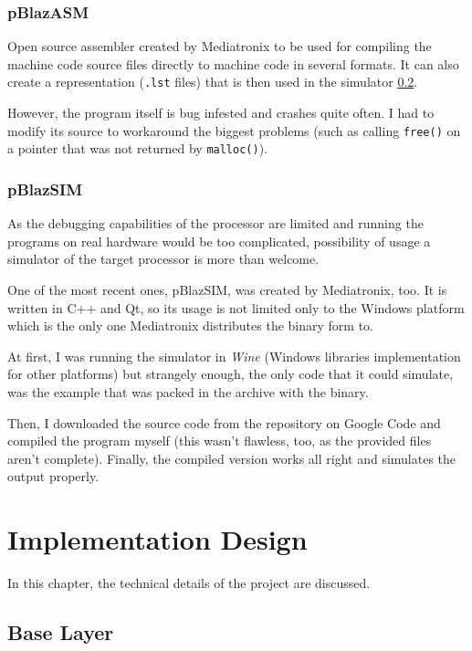         \subsection{pBlazASM}

        Open source assembler created by Mediatronix to be used for compiling the machine code source files directly to machine code in several formats. It can also create a representation (\texttt{.lst} files) that is then used in the simulator \ref{pblazsim}.

        However, the program itself is bug infested and crashes quite often. I had to modify its source to workaround the biggest problems (such as calling \texttt{free()} on a pointer that was not returned by \texttt{malloc()}).

        \subsection{pBlazSIM}\label{pblazsim}

        As the debugging capabilities of the processor are limited and running the programs on real hardware would be too complicated, possibility of usage a simulator of the target processor is more than welcome.

        One of the most recent ones, pBlazSIM, was created by Mediatronix, too. It is written in C++ and Qt, so its usage is not limited only to the Windows platform which is the only one Mediatronix distributes the binary form to.

        At first, I was running the simulator in \emph{Wine} (Windows libraries implementation for other platforms) but strangely enough, the only code that it could simulate, was the example that was packed in the archive with the binary.

        Then, I downloaded the source code from the repository on Google Code and compiled the program myself (this wasn't flawless, too, as the provided files aren't complete). Finally, the compiled version works all right and simulates the output properly.


\chapter{Implementation Design}\label{design}

In this chapter, the technical details of the project are discussed.

\section{Base Layer}

